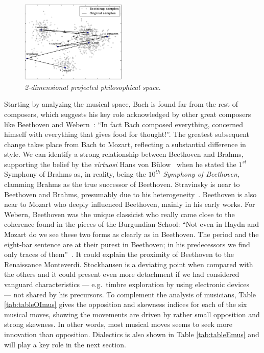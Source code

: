 \documentclass[
 aip,
 jmp,
 amsmath,amssymb,
 reprint,
]{revtex4-1}
\begin{document}
\begin{figure}
        \begin{center}
                \includegraphics[width=0.45\textwidth]{pca_filosofos_novo}
        \end{center}
        \caption{\it 2-dimensional projected philosophical space.}
        \label{fig:pcaphi}
\end{figure}

Starting by analyzing the musical space, Bach is found far from the rest of
composers, which suggests his key role
acknowledged by other great composers like Beethoven and
Webern~\cite{Webern}: ``In fact Bach composed everything, concerned
himself with everything that gives food for thought!''. 
The greatest subsequent change takes place from Bach to Mozart,
reflecting a substantial difference in style.
We can identify a strong relationship between
Beethoven and Brahms, supporting the belief by the \textit{virtuosi} Hans von B\"{u}low~\cite{Bulow} when he
stated the $1^{st}$ Symphony of Brahms as, in reality, being the \textit{$10^{th}$ Symphony of
Beethoven}, clamming Brahms as the true successor of
Beethoven. Stravinsky is near to Beethoven and Brahms,
presumably due to his heterogeneity~\cite{BennettHistory,
  Lovelock}. Beethoven is also near to Mozart who deeply influenced
Beethoven, mainly in his early works.
For Webern, Beethoven was the unique classicist who really came close
to the coherence found in the pieces of the Burgundian School: ``Not even
in Haydn and Mozart do we see these two forms as clearly as in
Beethoven. The period and the eight-bar sentence are at their purest
in Beethoven; in his predecessors we find only traces of them''~\cite{Webern}. It
could explain the proximity of Beethoven to the Renaissance  Monteverdi.
Stockhausen is a deviating point when compared with the others and it
could present even more detachment if we had considered
vanguard characteristics --- e.g.\ timbre exploration by using
electronic devices~\cite{Lovelock} --- not
shared by his precursors.
To complement the analysis of musicians, Table \ref{tab:tableOImus} gives the
opposition and skewness indices for each of the six musical moves,
showing the movements are driven by rather small opposition and strong
skewness. In other words, most musical moves seems to seek more innovation
than opposition. Dialectics is also shown in Table
\ref{tab:tableEmus} and will play a key role in the next section.
\end{document}
